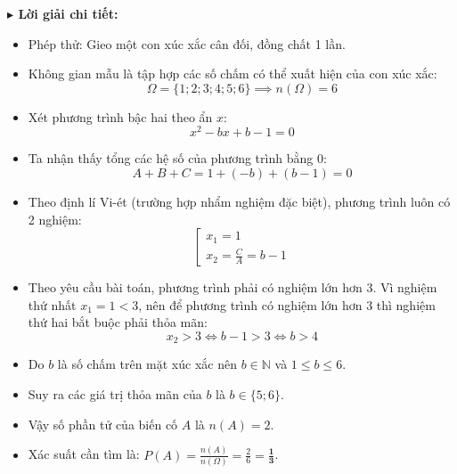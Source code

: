 \documentclass[12pt, a4paper, landscape]{article}
\newlength{\boxheight}
\begin{document}
\begin{minipage}[t]{0.53\textwidth}
\begin{tcolorbox}[solution_box={BÓC TÁCH LỜI GIẢI}, height=\boxheight]
\small
\textbf{\textsf{$\blacktriangleright$ Lời giải chi tiết:}}
\begin{itemize}[leftmargin=*, itemsep=4pt, parsep=0pt, topsep=2pt]
    \item Phép thử: Gieo một con xúc xắc cân đối, đồng chất 1 lần.
    \item Không gian mẫu là tập hợp các số chấm có thể xuất hiện của con xúc xắc: 
    $$ \Omega = \{1; 2; 3; 4; 5; 6\} \implies n(\Omega) = 6 $$
    \item Xét phương trình bậc hai theo ẩn $x$:
    $$ x^2 - bx + b - 1 = 0 $$
    \item Ta nhận thấy tổng các hệ số của phương trình bằng $0$:
    $$ A + B + C = 1 + (-b) + (b - 1) = 0 $$
    \item Theo định lí Vi-ét (trường hợp nhẩm nghiệm đặc biệt), phương trình luôn có 2 nghiệm:
    $$ \left[\begin{matrix} x_1 = 1 \\ x_2 = \frac{C}{A} = b - 1 \end{matrix}\right. $$
    \item Theo yêu cầu bài toán, phương trình phải có nghiệm lớn hơn 3. Vì nghiệm thứ nhất $x_1 = 1 < 3$, nên để phương trình có nghiệm lớn hơn 3 thì nghiệm thứ hai bắt buộc phải thỏa mãn:
    $$ x_2 > 3 \iff b - 1 > 3 \iff b > 4 $$
    \item Do $b$ là số chấm trên mặt xúc xắc nên $b \in \mathbb{N}$ và $1 \le b \le 6$. 
    \item Suy ra các giá trị thỏa mãn của $b$ là $b \in \{5; 6\}$.
    \item Vậy số phần tử của biến cố $A$ là $n(A) = 2$.
    \item Xác suất cần tìm là: $P(A) = \frac{n(A)}{n(\Omega)} = \frac{2}{6} = \mathbf{\frac{1}{3}}$.
\end{itemize}
\end{tcolorbox}
\end{minipage}
\end{document}
